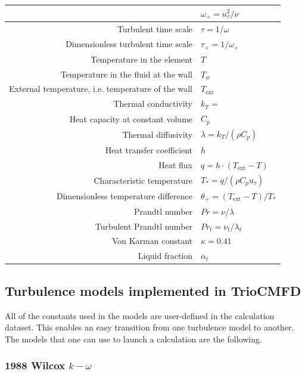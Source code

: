 \begin{center}
\begin{tabular}{|r|l|}
		& $\omega_+ = u_\tau^2/\nu$ \\ \hline
	Turbulent time scale
		& $\tau = 1/\omega$ \\ \hline
	Dimensionless turbulent time scale
		& $\tau_+ = 1/\omega_+$ \\ \hline 
	Temperature in the element 
		& $T$ \\ \hline
	Temperature in the fluid at the wall
		& $T_w$ \\ \hline
	External temperature, i.e. temperature of the wall
		& $T_{\text{ext}}$ \\ \hline
	Thermal conductivity
		& $k_T =$ \\ \hline
	Heat capacity at constant volume
		& $C_p$ \\ \hline
	Thermal diffusivity
		& $\lambda = k_T/(\rho C_p)$ \\ \hline
	Heat transfer coefficient
		& $h$	\\ \hline
	Heat flux
		& $q = h\cdot(T_\text{ext}-T)$ \\ \hline
	Characteristic temperature
		& $T_* = q/(\rho C_p u_\tau) $ \\ \hline
	Dimensionless temperature difference
		& $\theta_+ = (T_\text{ext}-T) /T_*$ \\ \hline
	Prandtl number
		& $Pr = \nu/\lambda$ \\ \hline
	Turbulent Prandtl number
		& $Pr_t = \nu_t/\lambda_t$ \\ \hline
	Von Karman constant
		& $\kappa = 0.41$ \\ \hline
	Liquid fraction 
		& $\alpha_l $ \\ \hline

\end{tabular}
\end{center}
\pagebreak

\subsection{Turbulence models implemented in TrioCMFD}

All of the constants used in the models are user-defined in the calculation dataset. This enables an easy transition from one turbulence model to another. The models that one can use to launch a calculation are the following.

\subsubsection{1988 Wilcox $k-\omega$}

